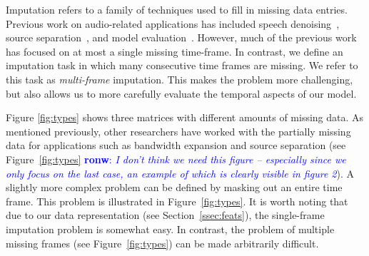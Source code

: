 \documentclass{article}
\newcommand{\FIXME}[2][FIXME]{\textcolor{blue}{\textbf{#1}: \emph{#2}}}
\begin{document}
Imputation refers to a family of techniques used to fill in missing
data entries.  Previous work on audio-related applications has
included speech denoising~\cite{Raj1998}, source
separation~\cite{Reyes-Gomez2005}, and model
evaluation~\cite{Smaragdis2009,Hoffman2010}.  However, much of the
previous work has focused on at most a single missing time-frame.
In contrast, we define an imputation task in which many consecutive
time frames are missing.  We refer to this task as \emph{multi-frame}
imputation.  This makes the problem more challenging, but also allows
us to more carefully evaluate the temporal aspects of our
model.  %

Figure \ref{fig:types} shows three matrices with different amounts of
missing data.  As mentioned previously, other researchers
\cite{Smaragdis2009} have worked with the partially missing data for
applications such as bandwidth expansion and source separation (see
Figure~\ref{fig:types} \FIXME[ronw]{I don't think we need this figure
  -- especially since we only focus on the last case, an example of
  which is clearly
  visible in figure 2}).  A slightly more complex problem can be
defined by masking out an entire time frame.  This problem is
illustrated in Figure~\ref{fig:types}.  It is worth noting that due to
our data representation (see Section~\ref{ssec:feats}), the
single-frame imputation problem is somewhat easy.  In contrast, the
problem of multiple missing frames (see Figure~\ref{fig:types}) can be
made arbitrarily difficult.
\end{document}
